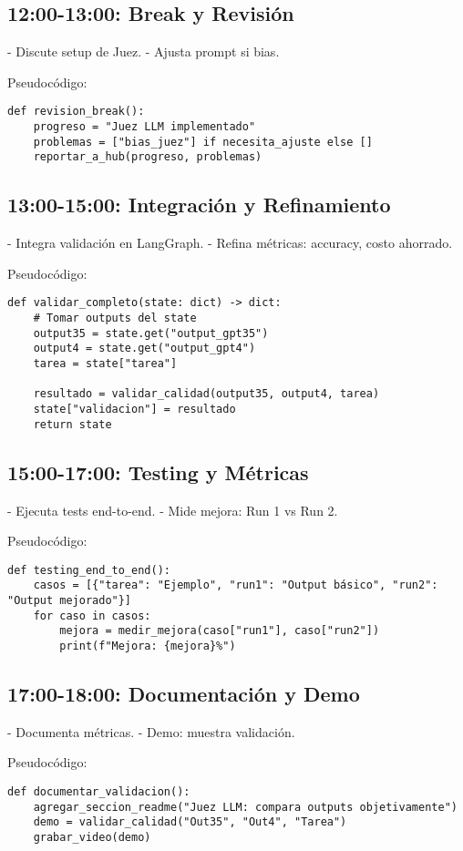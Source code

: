 \documentclass{article}
\begin{document}
\subsection{12:00-13:00: Break y Revisión}
- Discute setup de Juez.
- Ajusta prompt si bias.

Pseudocódigo:
\begin{lstlisting}
def revision_break():
    progreso = "Juez LLM implementado"
    problemas = ["bias_juez"] if necesita_ajuste else []
    reportar_a_hub(progreso, problemas)
\end{lstlisting}

\subsection{13:00-15:00: Integración y Refinamiento}
- Integra validación en LangGraph.
- Refina métricas: accuracy, costo ahorrado.

Pseudocódigo:
\begin{lstlisting}
def validar_completo(state: dict) -> dict:
    # Tomar outputs del state
    output35 = state.get("output_gpt35")
    output4 = state.get("output_gpt4")
    tarea = state["tarea"]
    
    resultado = validar_calidad(output35, output4, tarea)
    state["validacion"] = resultado
    return state
\end{lstlisting}

\subsection{15:00-17:00: Testing y Métricas}
- Ejecuta tests end-to-end.
- Mide mejora: Run 1 vs Run 2.

Pseudocódigo:
\begin{lstlisting}
def testing_end_to_end():
    casos = [{"tarea": "Ejemplo", "run1": "Output básico", "run2": "Output mejorado"}]
    for caso in casos:
        mejora = medir_mejora(caso["run1"], caso["run2"])
        print(f"Mejora: {mejora}%")
\end{lstlisting}

\subsection{17:00-18:00: Documentación y Demo}
- Documenta métricas.
- Demo: muestra validación.

Pseudocódigo:
\begin{lstlisting}
def documentar_validacion():
    agregar_seccion_readme("Juez LLM: compara outputs objetivamente")
    demo = validar_calidad("Out35", "Out4", "Tarea")
    grabar_video(demo)
\end{lstlisting}
\end{document}
